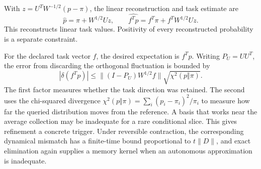 With $z=U^TW^{-1/2}(p-\pi)$, the linear reconstruction and task estimate are
\[
 \widehat p=\pi+W^{1/2}Uz,\qquad
 \widehat{f^Tp}=f^T\pi+f^TW^{1/2}Uz.
\]
This reconstructs linear task values. Positivity of every reconstructed probability is a separate constraint.




For the declared task vector $f$, the desired expectation is $f^Tp$. Writing $P_U=UU^T$, the error from discarding the orthogonal fluctuation is bounded by
\begin{equation}
 |\delta(f^Tp)|\leq\|(I-P_U)W^{1/2}f\|\sqrt{\chi^2(p\Vert\pi)}.
 \label{eq:memory-task-error}
\end{equation}
The first factor measures whether the task direction was retained. The second uses the chi-squared divergence $\chi^2(p\Vert\pi)=\sum_i(p_i-\pi_i)^2/\pi_i$ to measure how far the queried distribution moves from the reference. A basis that works near the average collection may be inadequate for a rare conditional slice. This gives refinement a concrete trigger. Under reversible contraction, the corresponding dynamical mismatch has a finite-time bound proportional to $t\|D\|$, and exact elimination again supplies a memory kernel when an autonomous approximation is inadequate.


